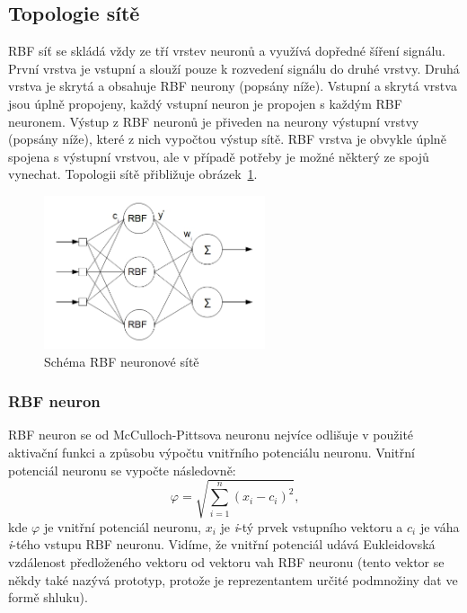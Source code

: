 \documentclass[11pt,twoside,a4paper]{book}
\begin{document}
\subsection{Topologie sítě}
RBF síť se skládá vždy ze tří vrstev neuronů a využívá dopředné šíření signálu. První vrstva je vstupní a slouží pouze k  rozvedení signálu do druhé vrstvy. Druhá vrstva je skrytá a obsahuje RBF neurony (popsány níže). Vstupní a skrytá vrstva jsou úplně propojeny, každý vstupní neuron je propojen s každým RBF neuronem. Výstup z RBF neuronů je přiveden na neurony výstupní vrstvy (popsány níže), které z nich vypočtou výstup sítě. RBF vrstva je obvykle úplně spojena s výstupní vrstvou, ale v případě potřeby je možné některý ze spojů vynechat. Topologii sítě přibližuje obrázek~\ref{fig:rbfschema}.
\begin{figure}[!h]
\begin{center}
\includegraphics[height=4.5cm]{figures/rbfschema.png}
\caption{Schéma RBF neuronové sítě}
\label{fig:rbfschema}
\end{center}
\end{figure}
\subsubsection{RBF neuron}
RBF neuron se od McCulloch-Pittsova neuronu nejvíce odlišuje v použité aktivační funkci a způsobu výpočtu vnitřního potenciálu neuronu. Vnitřní potenciál neuronu se vypočte následovně:
\begin{equation}
\varphi =\sqrt{\sum\limits_{i=1}^n(x_{i}-c_{i})^{2}} \mbox{,}
\end{equation}
kde \begin{math}\varphi\end{math} je vnitřní potenciál neuronu, \begin{math}x_{i}\end{math} je \textit{i}-tý prvek vstupního vektoru a 
\begin{math}c_{i}\end{math} je váha \textit{i}-tého vstupu RBF neuronu. Vidíme, že vnitřní potenciál udává Eukleidovská vzdálenost předloženého vektoru od vektoru vah RBF neuronu (tento vektor se někdy také nazývá prototyp, protože je reprezentantem určité podmnožiny dat ve formě shluku).
\end{document}
